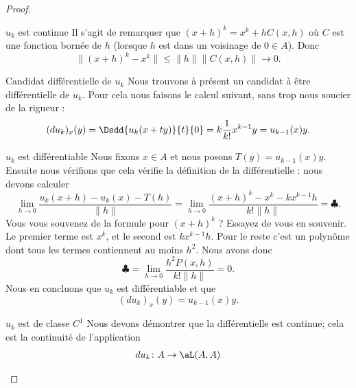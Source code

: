 \begin{proof}
\begin{subproof}
        \item[\( u_k\) est continue]
            Il s'agit de remarquer que \( (x+h)^k=x^k+hC(x,h)\) où \( C\) est une fonction bornée de \( h\) (lorsque \( h\) est dans un voisinage de \( 0\in A\)). Donc
            \begin{equation}
                \| (x+h)^k-x^k \|\leq \| h \|\| C(x,h) \|\to 0.
            \end{equation}
        \item[Candidat différentielle de \( u_k\)]
            Nous trouvons à présent un candidat à être différentielle de \( u_k\). Pour cela nous faisons le calcul suivant, sans trop nous soucier de la rigueur :
            \begin{equation}
                (du_k)_x(y)=\Dsdd{ u_k(x+ty) }{t}{0}=k\frac{1}{ k! }x^{k-1}y=u_{k-1}(x)y.
            \end{equation}
        \item[\( u_k\) est différentiable]
            Nous fixons \( x\in A\) et nous posons \( T(y)=u_{k-1}(x)y\). Ensuite nous vérifions que cela vérifie la définition de la différentielle : nous devons calculer
            \begin{equation}        \label{EQooNPKGooVmEYAV}
                \lim_{h\to 0} \frac{ u_k(x+h)-u_k(x)-T(h) }{ \| h \| }=\lim_{h\to 0} \frac{ (x+h)^k-x^k-kx^{k-1}h }{ k! \| h \| }=\clubsuit.
            \end{equation}
            Vous vous souvenez de la formule pour \( (x+h)^k\) ? Essayez de vous en souvenir. Le premier terme est \( x^k\), et le second est \( kx^{k-1}h\). Pour le reste c'est un polynôme dont tous les termes contiennent au moins \( h^2\). Nous avons donc
            \begin{equation}
                \clubsuit=\lim_{h\to 0} \frac{ h^2P(x,h) }{ k!\| h \| }=0.
            \end{equation}
            Nous en concluons que \( u_k\) est différentiable et que
            \begin{equation}
                (du_k)_x(y)=u_{k-1}(x)y.
            \end{equation}
        \item[\( u_k\) est de classe \( C^1\)]
            Nous devons démontrer que la différentielle est continue; cela est la continuité de l'application
            \begin{equation}
                \begin{aligned}
                    du_k\colon A&\to \aL(A,A) \\

\end{aligned}
\end{equation}
\end{subproof}
\end{proof}
